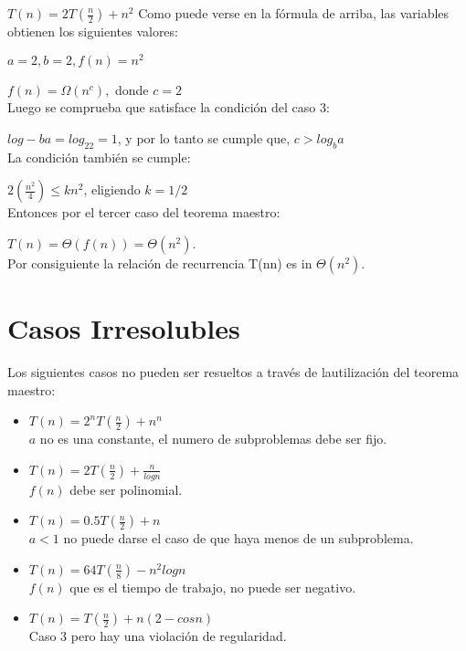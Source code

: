 \documentclass[12pt, letterpaper]{article} %
\begin{document}
$T(n)=2T(\frac{n}{2})+n^2$
Como puede verse en la fórmula de arriba, las variables obtienen los siguientes valores:
\par \hspace{2mm} $a=2, b=2, f(n)=n^2$
\par \hspace{2mm} $f(n)=\Omega(n^c),$ donde $c=2$\\
Luego se comprueba que satisface la condición del caso 3:
\par \hspace{2mm} $log-ba=log_22=1$, y por lo tanto se cumple que, $c>log_ba$\\
La condición también se cumple:
\par\hspace{2mm} $2(\frac{n^2}{4})\leq kn^2$, eligiendo $k=1/2$\\
Entonces por el tercer caso del teorema maestro:
\par\hspace{2mm} $T(n)=\Theta(f(n))=\Theta(n^2)$.\\
Por consiguiente la relación de recurrencia T(nn) es in $\Theta(n^2)$.

\section{Casos Irresolubles}
Los siguientes casos no pueden ser resueltos a través de lautilización del teorema maestro: \cite{massacusets}

\begin{itemize}
    \item $T(n)=2^nT(\frac{n}{2})+n^n$ \\
    $a$ no es una constante, el numero de subproblemas debe ser fijo.
    \item $T(n)=2T(\frac{n}{2})+\frac{n}{logn}$\\
    $f(n)$ debe ser polinomial.
   \item $T(n)=0.5T(\frac{n}{2})+n$ \\
    $a<1$ no puede darse el caso de que haya menos de un subproblema.
    \item $T(n)=64T(\frac{n}{8})-n^2logn$ \\
    $f(n)$ que es el tiempo de trabajo, no puede ser negativo.
    \item $T(n)=T(\frac{n}{2})+n(2-cosn)$ \\
    Caso 3 pero hay una violación de regularidad.

\end{itemize}
\end{document}
